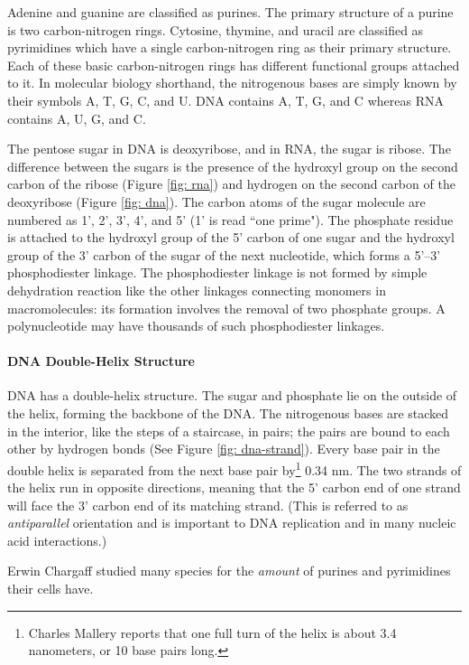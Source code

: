Adenine and guanine are classified as purines. The primary structure of a purine is two carbon-nitrogen rings. Cytosine, thymine, and uracil are classified as pyrimidines which have a single carbon-nitrogen ring as their primary structure. Each of these basic carbon-nitrogen rings has different functional groups attached to it. In molecular biology shorthand, the nitrogenous bases are simply known by their symbols A, T, G, C, and U. DNA contains A, T, G, and C whereas RNA contains A, U, G, and C.

The pentose sugar in DNA is deoxyribose, and in RNA, the sugar is ribose. The difference between the sugars is the presence of the hydroxyl group on the second carbon of the ribose (Figure \ref{fig: rna}) and hydrogen on the second carbon of the deoxyribose (Figure \ref{fig: dna}). The carbon atoms of the sugar molecule are numbered as 1', 2', 3', 4', and 5' (1' is read ``one prime"). The phosphate residue is attached to the hydroxyl group of the 5' carbon of one sugar and the hydroxyl group of the 3' carbon of the sugar of the next nucleotide, which forms a 5'–3' phosphodiester linkage. The phosphodiester linkage is not formed by simple dehydration reaction like the other linkages connecting monomers in macromolecules: its formation involves the removal of two phosphate groups. A polynucleotide may have thousands of such phosphodiester linkages.

\paragraph{DNA Double-Helix Structure}
DNA has a double-helix structure. The sugar and phosphate lie on the outside of the helix, forming the backbone of the DNA. The nitrogenous bases are stacked in the interior, like the steps of a staircase, in pairs; the pairs are bound to each other by hydrogen bonds (See Figure \ref{fig: dna-strand}). Every base pair in the double helix is separated from the next base pair by\footnote{Charles Mallery \cite{mallery} reports that one full turn of the helix is about 3.4 nanometers, or 10 base pairs long.} 0.34 nm. The two strands of the helix run in opposite directions, meaning that the 5' carbon end of one strand will face the 3' carbon end of its matching strand. (This is referred to as \emph{antiparallel} orientation and is important to DNA replication and in many nucleic acid interactions.)

Erwin Chargaff studied many species for the \emph{amount} of purines and pyrimidines their cells have. 

